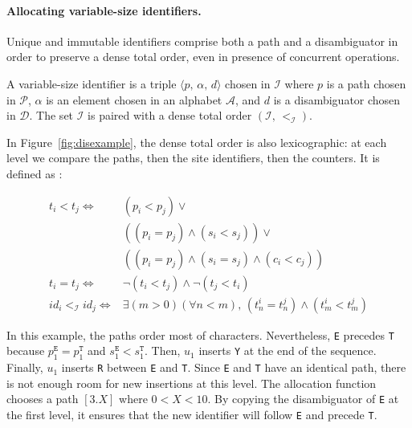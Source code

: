 \paragraph{Allocating variable-size identifiers.}

Unique and immutable identifiers comprise both a path and a disambiguator in
order to preserve a dense total order, even in presence of concurrent
operations.

\begin{definition}
  A variable-size identifier is a triple $\langle p,\, \alpha,\, d \rangle$
  chosen in $\mathcal{I}$ where $p$ is a path chosen in $\mathcal{P}$, $\alpha$
  is an element chosen in an alphabet $\mathcal{A}$, and $d$ is a disambiguator
  chosen in $\mathcal{D}$. The set $\mathcal{I}$ is paired with a dense total
  order $(\mathcal{I},\,<_\mathcal{I})$.
\end{definition}

In Figure~\ref{fig:disexample}, the dense total order is also lexicographic: at
each level we compare the paths, then the site identifiers, then the
counters. It is defined as :
\begin{small}
\begin{align*}
  t_i < t_j \iff & (p_i < p_j) \vee \\ &
                  ((p_i = p_j) \wedge (s_i<s_j)) \vee \\ &
                  ((p_i = p_j) \wedge (s_i = s_j) \wedge (c_i < c_j)) \\
  t_i = t_j \iff & \neg (t_i < t_j) \wedge \neg (t_j < t_i) \\
  id_i <_\mathcal{I} id_j \iff & \exists (m > 0)(\forall n < m),\, (t^i_n = t^j_n) \wedge                             (t^i_m < t^j_m) %
\end{align*}
\end{small}

In this example, the paths order most of characters. Nevertheless, \texttt{E}
precedes \texttt{T} because $p^\texttt{E}_1=p^\texttt{T}_1$ and
$s^\texttt{E}_1 < s^\texttt{T}_1$. Then, $u_1$ inserts \texttt{Y} at the end of
the sequence. Finally, $u_1$ inserts \texttt{R} between \texttt{E} and
\texttt{T}. Since \texttt{E} and \texttt{T} have an identical path, there is not
enough room for new insertions at this level. The allocation function chooses a
path $[3.X]$ where $0<X<10$. By copying the disambiguator of \texttt{E} at the
first level, it ensures that the new identifier will follow \texttt{E} and
precede \texttt{T}.


